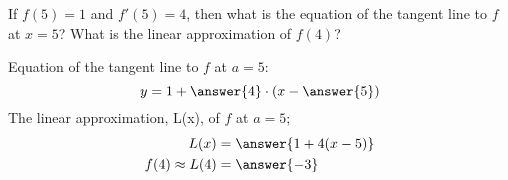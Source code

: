 \documentclass{ximera}
\author{Steven Gubkin\and Nela Lakos}
\begin{document}
\begin{exercise}
If $f(5)=1$ and $f'(5) = 4$, then what is the equation of the tangent
line to $f$ at $x=5$?  What is the linear approximation of $f(4)$?

\begin{prompt}
Equation of the tangent line to $f$ at $a=5$:
 $$y = 1+\answer{4}\cdot(x-\answer{5})$$
The linear approximation, L(x), of $f$ at $a=5$;
\begin{align*}
  L(x) &= \answer{1+4(x-5)}\\
  f(4) \approx L(4) &= \answer{-3}
\end{align*}
\end{prompt}



\end{exercise}
\end{document}
